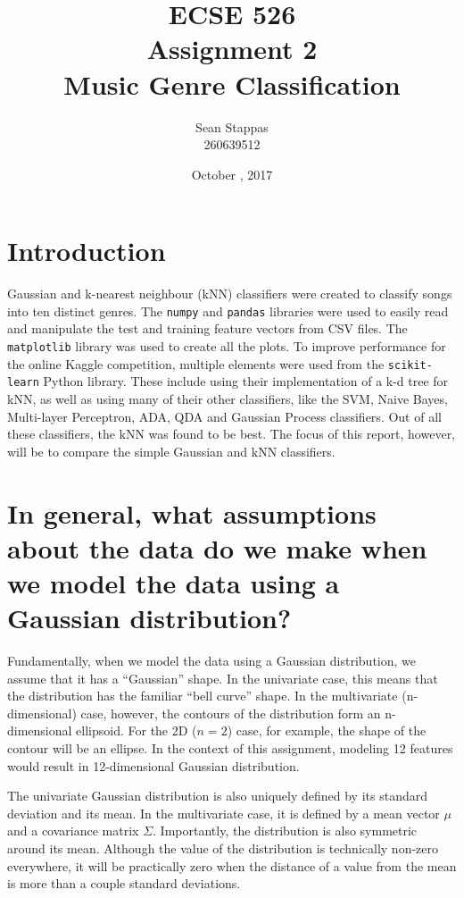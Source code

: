 \documentclass[a4paper,titlepage]{article}
\title{
	\textbf{ECSE 526 \\ Assignment 2}
	\\ \large Music Genre Classification
}
\author{Sean Stappas \\ 260639512}
\date{October \nth{19}, 2017}
\begin{document}
	\sloppy
	\maketitle
	\twocolumn
	
	\section*{Introduction}
	
	Gaussian and k-nearest neighbour (kNN) classifiers were created to classify songs into ten distinct genres. The \texttt{numpy} and \texttt{pandas} libraries were used to easily read and manipulate the test and training feature vectors from CSV files. The \texttt{matplotlib} library was used to create all the plots. To improve performance for the online Kaggle competition, multiple elements were used from the \texttt{scikit-learn} Python library. These include using their implementation of a k-d tree for kNN, as well as using many of their other classifiers, like the SVM, Naive Bayes, Multi-layer Perceptron, ADA, QDA and Gaussian Process classifiers. Out of all these classifiers, the kNN was found to be best. The focus of this report, however, will be to compare the simple Gaussian and kNN classifiers.
	
	\section{In general, what assumptions about the data do we make when we model the data using a Gaussian distribution?}
	
	Fundamentally, when we model the data using a Gaussian distribution, we assume that it has a ``Gaussian'' shape. In the univariate case, this means that the distribution has the familiar ``bell curve'' shape. In the multivariate (n-dimensional) case, however, the contours of the distribution form an n-dimensional ellipsoid. For the 2D ($n=2$) case, for example, the shape of the contour will be an ellipse. In the context of this assignment, modeling 12 features would result in 12-dimensional Gaussian distribution.
	
	The univariate Gaussian distribution is also uniquely defined by its standard deviation and its mean. In the multivariate case, it is defined by a mean vector $\mu$ and a covariance matrix $\Sigma$. Importantly, the distribution is also symmetric around its mean. Although the value of the distribution is technically non-zero everywhere, it will be practically zero when the distance of a value from the mean is more than a couple standard deviations.
	
\end{document}
